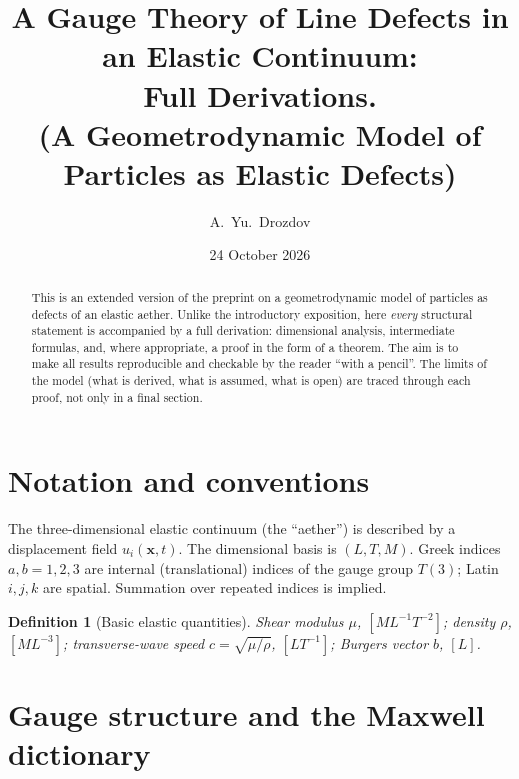 \documentclass[12pt,a4paper]{article}
\title{\textbf{A Gauge Theory of Line Defects in an Elastic Continuum:\\
Full Derivations.\\
{\large (A Geometrodynamic Model of Particles as Elastic Defects)}}}
\author{A.~Yu.~Drozdov}
\date{24 October 2026}
\newtheorem{definition}{Definition}
\begin{document}
\maketitle

\begin{abstract}
\noindent
This is an extended version of the preprint on a geometrodynamic model of
particles as defects of an elastic aether. Unlike the introductory exposition,
here \emph{every} structural statement is accompanied by a full derivation:
dimensional analysis, intermediate formulas, and, where appropriate, a proof in
the form of a theorem. The aim is to make all results reproducible and
checkable by the reader ``with a pencil''. The limits of the model (what is
derived, what is assumed, what is open) are traced through each proof, not only
in a final section.
\end{abstract}

\tableofcontents
\newpage

\section{Notation and conventions}
The three-dimensional elastic continuum (the ``aether'') is described by a
displacement field $u_i(\mathbf{x},t)$. The dimensional basis is $(L,T,M)$.
Greek indices $a,b=1,2,3$ are internal (translational) indices of the gauge
group $T(3)$; Latin $i,j,k$ are spatial. Summation over repeated indices is
implied.

\begin{definition}[Basic elastic quantities]
Shear modulus $\mu$, $[ML^{-1}T^{-2}]$; density $\rho$, $[ML^{-3}]$;
transverse-wave speed $c=\sqrt{\mu/\rho}$, $[LT^{-1}]$; Burgers vector $b$,
$[L]$.
\end{definition}

\section{Gauge structure and the Maxwell dictionary}
\end{document}
